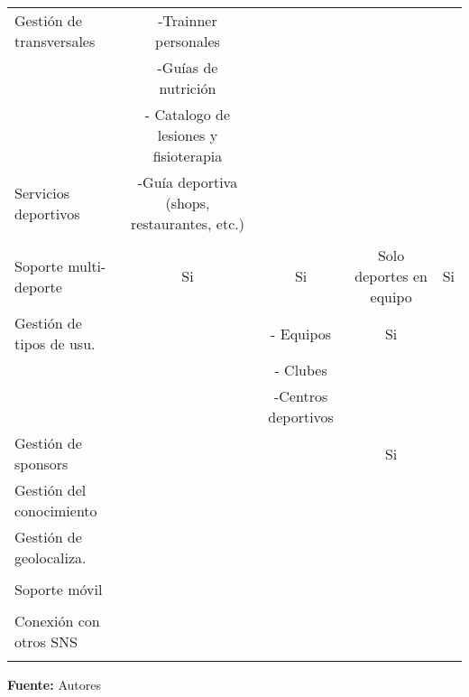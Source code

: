 \begin{landscape}
\begin{table}
\begin{center}
{\begin{tabular}{|p{5cm}|llll|}
    Gestión de transversales & \multicolumn{1}{c}{-Trainner personales} & \multicolumn{1}{c}{} & \multicolumn{1}{c}{} & \multicolumn{1}{c|}{} \\ 
     & \multicolumn{1}{c}{-Guías de nutrición} & \multicolumn{1}{c}{} & \multicolumn{1}{c}{} & \multicolumn{1}{c|}{} \\ 
     & \multicolumn{1}{c}{- Catalogo de lesiones y fisioterapia} & \multicolumn{1}{c}{} & \multicolumn{1}{c}{} & \multicolumn{1}{c|}{} \\ 
    \hline
    Servicios deportivos & \multicolumn{1}{c}{-Guía deportiva (shops, restaurantes, etc.)} & \multicolumn{1}{c}{} & \multicolumn{1}{c}{} & \multicolumn{1}{c|}{} \\ 
     & \multicolumn{1}{c}{} & \multicolumn{1}{c}{} & \multicolumn{1}{c}{} & \multicolumn{1}{c|}{} \\ 
    \hline
    Soporte multi-deporte & \multicolumn{1}{c}{Si} & \multicolumn{1}{c}{Si} & \multicolumn{1}{c}{Solo deportes en equipo} & \multicolumn{1}{c|}{Si} \\ 
    \hline
    Gestión de tipos de usu. & \multicolumn{1}{c}{} & \multicolumn{1}{c}{- Equipos } & \multicolumn{1}{c}{Si} & \multicolumn{1}{c|}{} \\ 
     & \multicolumn{1}{c}{} & \multicolumn{1}{c}{- Clubes} & \multicolumn{1}{c}{} & \multicolumn{1}{c|}{} \\ 
     & \multicolumn{1}{c}{} & \multicolumn{1}{c}{-Centros deportivos} & \multicolumn{1}{c}{} & \multicolumn{1}{c|}{} \\ 
    \hline
    Gestión de sponsors & \multicolumn{1}{c}{} & \multicolumn{1}{c}{} & \multicolumn{1}{c}{Si} & \multicolumn{1}{c|}{} \\ 
    \hline
    Gestión del conocimiento & \multicolumn{1}{c}{} & \multicolumn{1}{c}{} & \multicolumn{1}{c}{} & \multicolumn{1}{c|}{} \\ 
    \hline
    Gestión de geolocaliza. & \multicolumn{1}{c}{} & \multicolumn{1}{c}{} & \multicolumn{1}{c}{} & \multicolumn{1}{c|}{} \\ 
     & \multicolumn{1}{c}{} & \multicolumn{1}{c}{} & \multicolumn{1}{c}{} & \multicolumn{1}{c|}{} \\ 
    \hline
    Soporte móvil & \multicolumn{1}{c}{} & \multicolumn{1}{c}{} & \multicolumn{1}{c}{} & \multicolumn{1}{c|}{} \\ 
     & \multicolumn{1}{c}{} & \multicolumn{1}{c}{} & \multicolumn{1}{c}{} & \multicolumn{1}{c|}{} \\ 
    \hline
    Conexión con otros SNS & \multicolumn{1}{c}{} & \multicolumn{1}{c}{} & \multicolumn{1}{c}{} & \multicolumn{1}{c|}{} \\ 
     & \multicolumn{1}{c}{} & \multicolumn{1}{c}{} & \multicolumn{1}{c}{} & \multicolumn{1}{c|}{} \\ 
    \hline
  \end{tabular}
  }
  \textbf{Fuente:} Autores
    \end{center}
\end{table}
  

\end{landscape}
